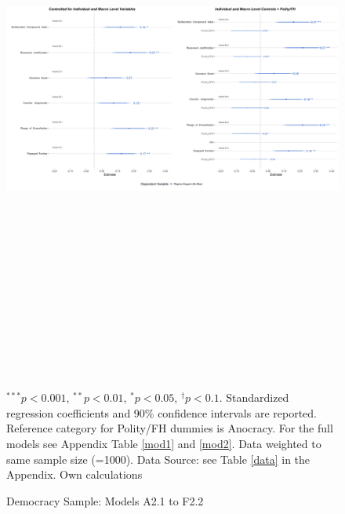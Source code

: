 \documentclass[]{article}
\begin{document}
\begin{landscape}
    \begin{figure}
        \caption{Democracy Sample: Models A2.1 to F2.2}
        \label{reg2}
        \includegraphics[width=690pt,height=530pt]{images/coefplot_dem.png}
        \flushright
        {\scriptsize $^{***}p<0.001$, $^{**}p<0.01$, $^*p<0.05$, $^{\dagger}p<0.1$. Standardized regression coefficients and 90\% confidence intervals are reported. Reference category for Polity/FH dummies is Anocracy. For the full models see Appendix Table \ref{mod1} and \ref{mod2}. Data weighted to same sample size (=1000). Data Source: see Table \ref{data} in the Appendix. Own calculations  \par}
    \end{figure}
\end{landscape}
\end{document}
